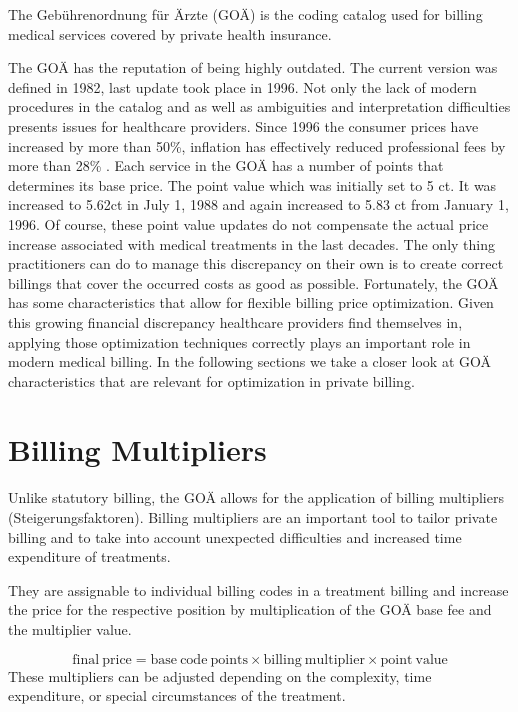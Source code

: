 The Gebührenordnung für Ärzte (GOÄ) is the coding catalog used for billing medical services covered by private health insurance.

The GOÄ has the reputation of being highly outdated\cite{heller2015goa}.
The current version was defined in 1982, last update took place in 1996.
Not only the lack of modern procedures in the catalog and as well as ambiguities and interpretation difficulties presents issues for healthcare providers.
Since 1996 the consumer prices have increased by more than 50\%, inflation has effectively reduced professional fees by more than 28\% \cite{schmitzgoa}.
Each service in the GOÄ has a number of points that determines its base price.
The point value which was initially set to 5 ct.
It was increased to 5.62ct in July 1, 1988 and again increased to 5.83 ct from January 1, 1996\cite{hermanns2013bemessung}.
Of course, these point value updates do not compensate the actual price increase associated with medical treatments in the last decades.
The only thing practitioners can do to manage this discrepancy on their own is to create correct billings that cover the occurred costs as good as possible.
Fortunately, the GOÄ has some characteristics that allow for flexible billing price optimization.
Given this growing financial discrepancy healthcare providers find themselves in, applying those optimization techniques correctly plays an important role in modern medical billing.
In the following sections we take a closer look at GOÄ characteristics that are relevant for optimization in private billing.

\section{Billing Multipliers}\label{sec:billing-multipliers}
Unlike statutory billing, the GOÄ allows for the application of billing multipliers (Steigerungsfaktoren).
Billing multipliers are an important tool to tailor private billing and to take into account unexpected difficulties and increased time expenditure of treatments\cite{walter2008abrechnung}.

They are assignable to individual billing codes in a treatment billing and increase the price for the respective position by multiplication of the GOÄ base fee and the multiplier value.

\[
    \mathrm{final\ price} = \mathrm{base\ code\ points} \times \mathrm{billing\ multiplier} \times \mathrm{point\ value}
\]
These multipliers can be adjusted depending on the complexity, time expenditure, or special circumstances of the treatment.

